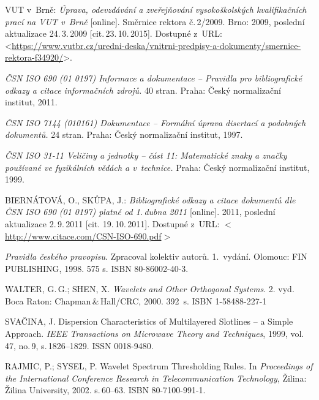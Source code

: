 

\begin{literatura}{99}
	
		VUT v~Brně:
    \emph{Úprava, odevzdávání a zveřejňování vysokoškolských kva\-li\-fi\-kač\-ních prací na VUT v~Brně}\/ [online].
		Směrnice rektora č.\,2/2009.
		Brno: 2009, po\-sled\-ní aktualizace 24.\,3.\,2009 [cit.\,23.\,10.\,2015].
    Dostupné z~URL:\\
    <\url{https://www.vutbr.cz/uredni-deska/vnitrni-predpisy-a-dokumenty/smernice-rektora-f34920/}>.

    \emph{ČSN ISO 690 (01 0197) Informace a dokumentace -- Pravidla pro bibliografické odkazy a citace informačních zdrojů.}
    40 stran. Praha: Český normalizační institut, 2011.

    \emph{ČSN ISO 7144 (010161) Dokumentace -- Formální úprava disertací a podobných dokumentů.}
    24 stran. Praha: Český normalizační institut, 1997.

    \emph{ČSN ISO 31-11 Veličiny a jednotky -- část 11: Matematické znaky a značky používané ve fyzikálních vědách a v~technice.}
    Praha: Český normalizační institut, 1999.

    BIERNÁTOVÁ, O., SKŮPA, J.:
    \emph{Bibliografické odkazy a citace dokumentů dle ČSN ISO 690 (01 0197) platné od 1.\,dubna 2011}\/ [online].
    2011, poslední aktualizace 2.\,9.\,2011 [cit. 19.\,10.\,2011].
    Dostupné z~URL:
    \(<\)\url{http://www.citace.com/CSN-ISO-690.pdf}\(>\)

    \emph{Pravidla českého pravopisu}.
    Zpracoval kolektiv autorů. 1.\ vydání.
    Olomouc: FIN PUB\-LISH\-ING, 1998. 575 s. ISBN 80-86002-40-3.

	WALTER, G.\,G.; SHEN, X.
	\emph{Wavelets and Other Orthogonal Systems}.
	2. vyd. Boca Raton: Chapman\,\&\,Hall/CRC, 2000. 392~s. ISBN 1-58488-227-1

	SVAČINA, J.
	Dispersion Characteristics of Multilayered Slotlines -- a Simple Approach.
	\emph{IEEE Transactions on Microwave Theory and Techniques},
	1999, vol.\,47, no.\,9, s.\,1826--1829. ISSN 0018-9480.

    RAJMIC, P.; SYSEL, P.
    Wavelet Spectrum Thresholding Rules.
    In \emph{Proceedings of the International Conference Research in Telecommunication Technology},
    Žilina: Žilina University, 2002. s.\,60--63. ISBN 80-7100-991-1.

\end{literatura}


